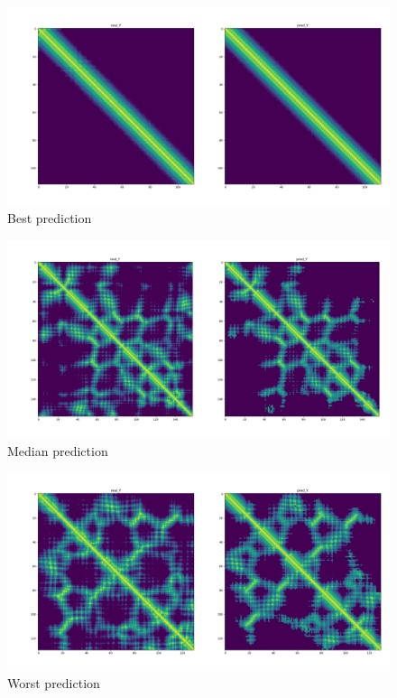 \begin{figure}
    \centering
    \includegraphics[width=\linewidth]{imgs_andy/2fxmB00_best_prediction.png}
    \caption{Best prediction}
    \label{fig:best}
\end{figure}

\begin{figure}
    \centering
    \includegraphics[width=\linewidth]{imgs_andy/1mdbA01_median_prediction.png}
    \caption{Median prediction}
    \label{fig:median}
\end{figure}

\begin{figure}
    \centering
    \includegraphics[width=\linewidth]{imgs_andy/3kitJ00_worst_prediction.png}
    \caption{Worst prediction}
    \label{fig:worst}
\end{figure}

